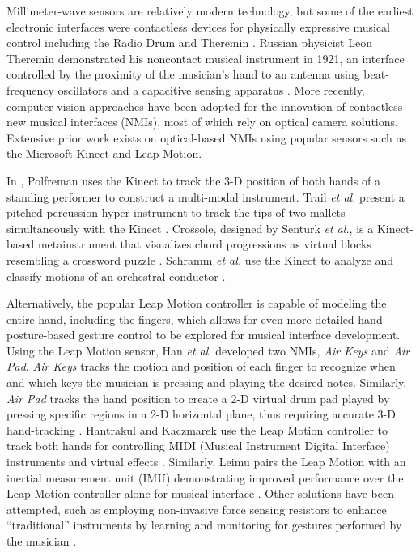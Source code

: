 \documentclass[10pt,journal,final]{IEEEtran}
\begin{document}
Millimeter-wave sensors are relatively modern technology, but some of the earliest electronic interfaces were contactless devices for physically expressive musical control including the Radio Drum and Theremin \cite{winkler1995making}. 
Russian physicist Leon Theremin demonstrated his noncontact musical instrument in 1921, an interface controlled by the proximity of the musician's hand to an antenna using beat-frequency oscillators and a capacitive sensing apparatus \cite{skeldon1998physics}. 
More recently, computer vision approaches have been adopted for the innovation of contactless new musical interfaces (NMIs), most of which rely on optical camera solutions. 
Extensive prior work exists on optical-based NMIs using popular sensors such as the Microsoft Kinect and Leap Motion. 

In \cite{polfreman2011multi}, Polfreman uses the Kinect to track the 3-D position of both hands of a standing performer to construct a multi-modal instrument. 
Trail \textit{et al.} present a pitched percussion hyper-instrument to track the tips of two mallets simultaneously with the Kinect \cite{trail2012non}. 
Crossole, designed by Senturk \textit{et al.}, is a Kinect-based metainstrument that visualizes chord progressions as virtual blocks resembling a crossword puzzle \cite{senturk2012crossole}. 
Schramm \textit{et al.} use the Kinect to analyze and classify motions of an orchestral conductor \cite{schramm2015dynamic}. 

Alternatively, the popular Leap Motion controller is capable of modeling the entire hand, including the fingers, which allows for even more detailed hand posture-based gesture control to be explored for musical interface development. 
Using the Leap Motion sensor, Han \textit{et al.} developed two NMIs, \textit{Air Keys} and \textit{Air Pad}. 
\textit{Air Keys} tracks the motion and position of each finger to recognize when and which keys the musician is pressing and playing the desired notes. 
Similarly, \textit{Air Pad} tracks the hand position to create a 2-D virtual drum pad played by pressing specific regions in a 2-D horizontal plane, thus requiring accurate 3-D hand-tracking \cite{han2014lessons}. 
Hantrakul and Kaczmarek use the Leap Motion controller to track both hands for controlling MIDI (Musical Instrument Digital Interface) instruments and virtual effects \cite{hantrakul2014implementations}. 
Similarly, Leimu pairs the Leap Motion with an inertial measurement unit (IMU) demonstrating improved performance over the Leap Motion controller alone for musical interface \cite{brown2016leimu}. 
Other solutions have been attempted, such as employing non-invasive force sensing resistors to enhance ``traditional'' instruments by learning and monitoring for gestures performed by the musician \cite{tindale2011training}. 
\end{document}
